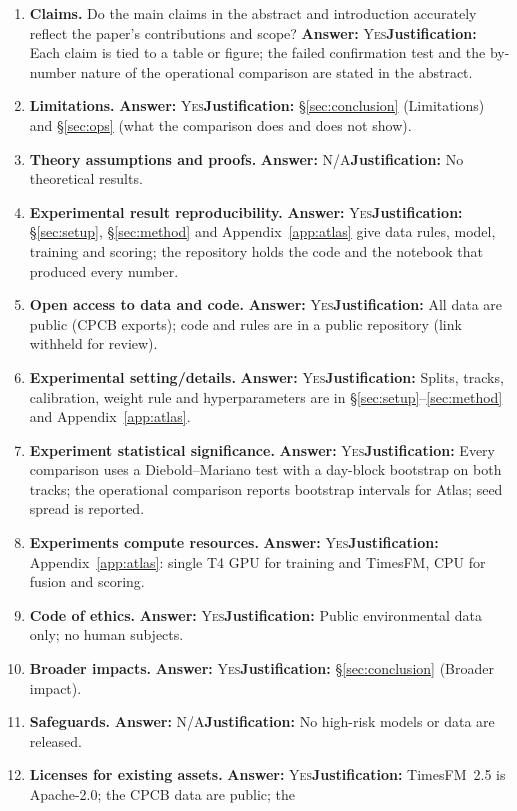 \documentclass{article}
\newif\ifpreprint
\begin{document}
\newcommand{\ans}[2]{\textbf{Answer:} \textsc{#1}\quad \textbf{Justification:} #2\par\smallskip}
\begin{enumerate}[leftmargin=1.4em,itemsep=2pt]
\item \textbf{Claims.} Do the main claims in the abstract and introduction accurately reflect the paper's contributions
  and scope? \ans{Yes}{Each claim is tied to a table or figure; the failed confirmation test and the by-number nature of
  the operational comparison are stated in the abstract.}
\item \textbf{Limitations.} \ans{Yes}{\S\ref{sec:conclusion} (Limitations) and \S\ref{sec:ops} (what the comparison
  does and does not show).}
\item \textbf{Theory assumptions and proofs.} \ans{N/A}{No theoretical results.}
\item \textbf{Experimental result reproducibility.} \ans{Yes}{\S\ref{sec:setup}, \S\ref{sec:method} and
  Appendix~\ref{app:atlas} give data rules, model, training and scoring; the repository holds the code and the notebook
  that produced every number.}
\item \textbf{Open access to data and code.} \ans{Yes}{All data are public (CPCB exports); code and rules are in a
  public repository (\ifpreprint\url{https://github.com/paradoxailab/paradox-world-model}\else link withheld for review\fi).}
\item \textbf{Experimental setting/details.} \ans{Yes}{Splits, tracks, calibration, weight rule and hyperparameters
  are in \S\ref{sec:setup}--\ref{sec:method} and Appendix~\ref{app:atlas}.}
\item \textbf{Experiment statistical significance.} \ans{Yes}{Every comparison uses a Diebold--Mariano test with a
  day-block bootstrap on both tracks; the operational comparison reports bootstrap intervals for Atlas; seed spread is
  reported.}
\item \textbf{Experiments compute resources.} \ans{Yes}{Appendix~\ref{app:atlas}: single T4 GPU for training and
  TimesFM, CPU for fusion and scoring.}
\item \textbf{Code of ethics.} \ans{Yes}{Public environmental data only; no human subjects.}
\item \textbf{Broader impacts.} \ans{Yes}{\S\ref{sec:conclusion} (Broader impact).}
\item \textbf{Safeguards.} \ans{N/A}{No high-risk models or data are released.}
\item \textbf{Licenses for existing assets.} \ans{Yes}{TimesFM~2.5 is Apache-2.0; the CPCB data are public; the
}
\end{enumerate}
\end{document}
